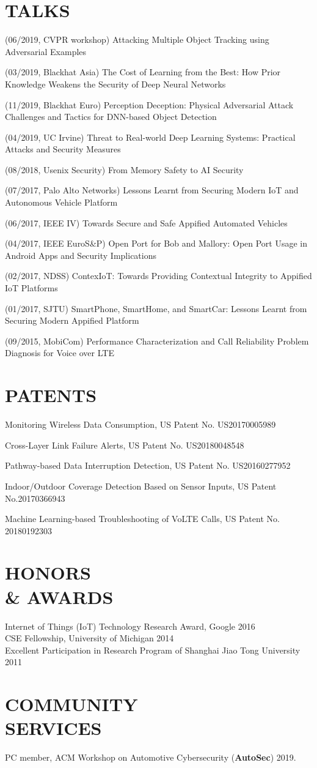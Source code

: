 \documentclass[margin]{res}
\begin{document}
\begin{resume}
\section{TALKS}

(06/2019, CVPR workshop) Attacking Multiple Object Tracking using Adversarial Examples

(03/2019, Blackhat Asia) The Cost of Learning from the Best: How Prior Knowledge Weakens the Security of Deep Neural Networks

(11/2019, Blackhat Euro) Perception Deception: Physical Adversarial Attack Challenges and Tactics for DNN-based Object Detection

(04/2019, UC Irvine) Threat to Real-world Deep Learning Systems: Practical Attacks and Security Measures

(08/2018, Usenix Security) From Memory Safety to AI Security

(07/2017, Palo Alto Networks) Lessons Learnt from Securing Modern IoT and Autonomous Vehicle Platform

(06/2017, IEEE IV) Towards Secure and Safe Appified Automated Vehicles

(04/2017, IEEE EuroS\&P) Open Port for Bob and Mallory: Open Port Usage in Android Apps and Security Implications

(02/2017, NDSS) ContexIoT: Towards Providing Contextual Integrity to Appified IoT Platforms

(01/2017, SJTU) SmartPhone, SmartHome, and SmartCar: Lessons Learnt from Securing Modern Appified Platform

(09/2015, MobiCom) Performance Characterization and Call Reliability Problem Diagnosis for Voice over LTE

\section{PATENTS}

Monitoring Wireless Data Consumption, US Patent No. US20170005989

Cross-Layer Link Failure Alerts, US Patent No. US20180048548

Pathway-based Data Interruption Detection, US Patent No. US20160277952

Indoor/Outdoor Coverage Detection Based on Sensor Inputs, US Patent No.20170366943

Machine Learning-based Troubleshooting of VoLTE Calls, US Patent No. 20180192303


\section{HONORS\\ \& AWARDS}
Internet of Things (IoT) Technology Research Award, Google \hfill 2016\\
CSE Fellowship, University of Michigan \hfill 2014 \\
Excellent Participation in Research Program of Shanghai Jiao Tong University \hfill 2011 \\

\section{COMMUNITY\\ SERVICES}
PC member, ACM Workshop on Automotive Cybersecurity (\textbf{AutoSec}) 2019.
\end{resume}
\end{document}
